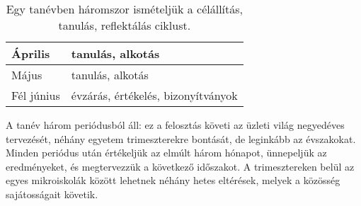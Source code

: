 \begin{table}
\begin{tabular}{ l|l }
    Április          &
    tanulás, alkotás
    \\ \hline

    Május            &
    tanulás, alkotás
    \\ \hline

    Fél június       &
    évzárás, értékelés, bizonyítványok
  \end{tabular}
  \caption{Egy tanévben háromszor ismételjük a célállítás, tanulás,
    reflektálás ciklust.}
  \label{tbl:tanevritmus}
\end{table}

A tanév három periódusból áll: ez a felosztás követi az üzleti világ negyedéves
tervezését, néhány egyetem trimeszterekre bontását, de leginkább az évszakokat.
Minden periódus után értékeljük az elmúlt három hónapot, ünnepeljük az
eredményeket, és megtervezzük a következő időszakot.  A trimesztereken belül az
egyes mikroiskolák között lehetnek néhány hetes eltérések, melyek a közösség
sajátosságait követik.